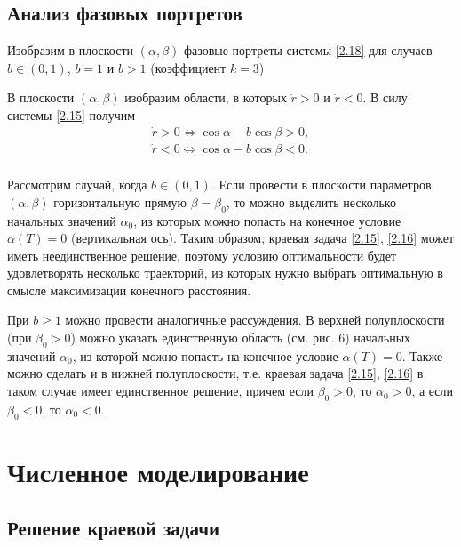 \documentclass[a4paper,12pt, openany]{book}
\theoremstyle{plain} %
\theoremstyle{definition} %
\theoremstyle{remark} %
\numberwithin{equation}{chapter}
\begin{document}
{\subsection{Анализ фазовых портретов}

Изобразим в плоскости $(\alpha,\beta)$ фазовые портреты системы \eqref{2.18} для случаев $b\in(0,1)$, $b=1$ и $b>1$ (коэффициент $k = 3$)




\newpage

В плоскости $(\alpha, \beta)$ изобразим области, в которых $\dot r >0$ и $\dot r <0$. В силу системы \eqref{2.15} получим 
\begin{equation}\label{2.33}
\begin{array}{l}
 \dot r > 0 \Longleftrightarrow \cos \alpha  - b\cos \beta  > 0, \\ 
 \dot r < 0 \Longleftrightarrow \cos \alpha  - b\cos \beta  < 0. \\ 
 \end{array}
\end{equation}




\newpage
Рассмотрим случай, когда $b\in(0,1)$. Если провести в плоскости параметров $(\alpha,\beta)$ горизонтальную прямую $\beta = \beta_0$, то можно выделить несколько начальных значений $\alpha_0$, из которых можно попасть на конечное условие $\alpha(T) = 0$ (вертикальная ось). Таким образом, краевая задача \eqref{2.15}, \eqref{2.16} может иметь неединственное решение, поэтому условию оптимальности будет удовлетворять несколько траекторий, из которых нужно выбрать оптимальную в смысле максимизации конечного расстояния. 

При $b\geqslant 1$ можно провести аналогичные рассуждения. В верхней полуплоскости (при $\beta_0>0$) можно указать единственную область (см. рис. 6) начальных значений  $\alpha_0$, из которой можно попасть на конечное условие $\alpha(T) = 0$. Также можно сделать и в нижней полуплоскости, т.е. краевая задача \eqref{2.15}, \eqref{2.16} в таком случае имеет единственное решение, причем если $\beta_0 >0$, то $\alpha_0 >0$, а если $\beta_0 < 0$, то $\alpha_0 < 0$. 


\section{Численное моделирование}
\subsection{Решение краевой задачи}

}
\end{document}
